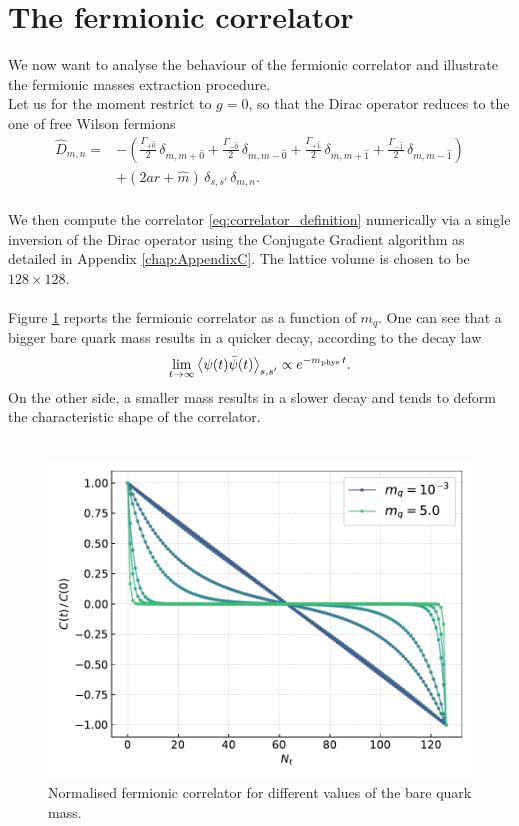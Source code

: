 \section{The fermionic correlator}
We now want to analyse the behaviour of the fermionic correlator and illustrate the fermionic masses extraction procedure. \\
Let us for the moment restrict to $g = 0$, so that the Dirac operator reduces to the one of free Wilson fermions 
\begin{equation}
    \begin{aligned}
    \widehat{D}_{m, n} = &- \left(\frac{\Gamma_{+\hat 0}}{2} \, \delta_{m, m+\hat 0} +\frac{\Gamma_{-\hat 0}}{2} \, \delta_{m, m-\hat 0} + \frac{\Gamma_{+\hat 1}}{2} \, \delta_{m, m+\hat 1} + \frac{\Gamma_{- \hat 1}}{2} \, \delta_{m, m-\hat 1}\right)  \\
     &+ \left(2ar + \hat m \right) \, \delta_{s,s'} \, \delta_{m,n}. \\
    \end{aligned}
    \label{eq:wilson-dirac_operator_free}
\end{equation}
\raggedright We then compute the correlator \eqref{eq:correlator_definition} numerically via a single inversion of the Dirac operator using the Conjugate Gradient algorithm as detailed in Appendix \ref{chap:AppendixC}. The lattice volume is chosen to be $128 \times 128$. \\~\\
Figure \ref{fig:correlator_mass} reports the fermionic correlator as a function of $m_q$. One can see that a bigger bare quark mass results in a quicker decay, according to the decay law 
\begin{equation*}
    \lim_{t \to \infty} \left\langle \psi(t)\bar\psi(t) \right\rangle_{s,s'} \propto e^{-m_\text{phys} \, t}.
\end{equation*}
On the other side, a smaller mass results in a slower decay and tends to deform the characteristic shape of the correlator. \\~\\
\begin{figure}[h]
    \centering 
    \includegraphics[scale=0.6]{figures/correlator/correlator.pdf}
    \caption[Fermionic correlator]{Normalised fermionic correlator for different values of the bare quark mass.}
    \label{fig:correlator_mass}
\end{figure}
